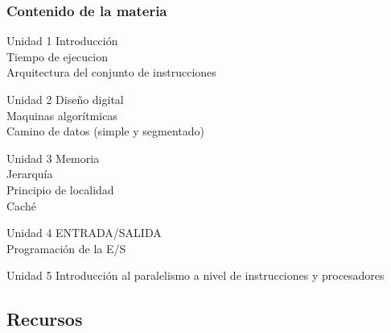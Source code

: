 \documentclass[aspectratio=169,compress]{beamer}
\begin{document}
\begin{frame}[fragile]
  \frametitle{Contenido de la materia}


\begin{description}
\begin{small}
\item[Unidad 1] Introducción \\ Tiempo de ejecucion \\ Arquitectura del conjunto de instrucciones 
\item[Unidad 2] Diseño digital \\ Maquinas algorítmicas \\ Camino de datos (simple y segmentado)
\item[Unidad 3] Memoria \\ Jerarquía \\ Principio de localidad \\ Caché 
\item[Unidad 4] ENTRADA/SALIDA \\ Programación de la E/S
\item[Unidad 5] Introducción al paralelismo a nivel de instrucciones y procesadores

\end{small}
\end{description}

\end{frame}


\subsection{Recursos}
\end{document}
